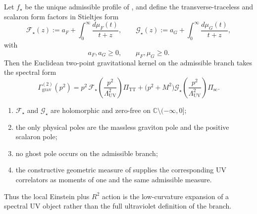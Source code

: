 \begin{theorem}
\label{thm:spectral-uv-completion}
Let $f_\star$ be the unique admissible profile of , and define
the transverse-traceless and scalaron form factors in Stieltjes form
\[
\mathcal F_\star(z)
:=
a_F+\int_0^\infty \frac{d\mu_F(t)}{t+z},
\qquad
\mathcal G_\star(z)
:=
a_G+\int_0^\infty \frac{d\mu_G(t)}{t+z},
\]
with
\[
a_F,a_G\ge 0,
\qquad
\mu_F,\mu_G\ge 0.
\]
Then the Euclidean two-point gravitational kernel on the admissible branch takes the spectral form
\[
\Gamma_{\mathrm{grav}}^{(2)}(p^2)
=
p^2\,\mathcal F_\star\!\left(\frac{p^2}{\Lambda_{\mathrm{UV}}^2}\right)\Pi_{\mathrm{TT}}
+
\bigl(p^2+M^2\bigr)\mathcal G_\star\!\left(\frac{p^2}{\Lambda_{\mathrm{UV}}^2}\right)\Pi_{\mathrm{sc}}.
\]
\begin{enumerate}[label=(\roman*), leftmargin=1.5em, topsep=3pt, itemsep=2pt]
    \item $\mathcal F_\star$ and $\mathcal G_\star$ are holomorphic and zero-free on
    $\mathbb C\setminus(-\infty,0]$;
    \item the only physical poles are the massless graviton pole and the positive scalaron pole;
    \item no ghost pole occurs on the admissible branch;
    \item the constructive geometric measure of  supplies the
    corresponding UV correlators as moments of one and the same admissible measure.
\end{enumerate}
Thus the local Einstein plus $R^2$ action is the low-curvature expansion of a spectral UV object
rather than the full ultraviolet definition of the branch.
\end{theorem}

